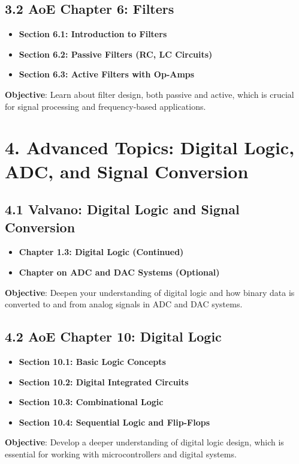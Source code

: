 \documentclass{article}
\begin{document}
\subsection*{3.2 AoE Chapter 6: Filters}
\begin{itemize}
    \item \textbf{Section 6.1: Introduction to Filters}
    \item \textbf{Section 6.2: Passive Filters (RC, LC Circuits)}
    \item \textbf{Section 6.3: Active Filters with Op-Amps}
\end{itemize}
\textbf{Objective}: Learn about filter design, both passive and active, which is crucial for signal processing and frequency-based applications.

\section*{4. Advanced Topics: Digital Logic, ADC, and Signal Conversion}

\subsection*{4.1 Valvano: Digital Logic and Signal Conversion}
\begin{itemize}
    \item \textbf{Chapter 1.3: Digital Logic (Continued)}
    \item \textbf{Chapter on ADC and DAC Systems (Optional)}
\end{itemize}
\textbf{Objective}: Deepen your understanding of digital logic and how binary data is converted to and from analog signals in ADC and DAC systems.

\subsection*{4.2 AoE Chapter 10: Digital Logic}
\begin{itemize}
    \item \textbf{Section 10.1: Basic Logic Concepts}
    \item \textbf{Section 10.2: Digital Integrated Circuits}
    \item \textbf{Section 10.3: Combinational Logic}
    \item \textbf{Section 10.4: Sequential Logic and Flip-Flops}
\end{itemize}
\textbf{Objective}: Develop a deeper understanding of digital logic design, which is essential for working with microcontrollers and digital systems.
\end{document}
